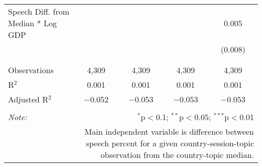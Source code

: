 \begin{table}[!htbp]
\begin{tabular}{@{\extracolsep{5pt}}lcccc}
 Speech Diff. from Median * Log GDP &  &  &  & 0.005 \\ 
  &  &  &  & (0.008) \\ 
  & & & & \\ 
\hline \\[-1.8ex] 
Observations & 4,309 & 4,309 & 4,309 & 4,309 \\ 
R$^{2}$ & 0.001 & 0.001 & 0.001 & 0.001 \\ 
Adjusted R$^{2}$ & $-$0.052 & $-$0.053 & $-$0.053 & $-$0.053 \\ 
\hline 
\hline \\[-1.8ex] 
\textit{Note:}  & \multicolumn{4}{r}{$^{*}$p$<$0.1; $^{**}$p$<$0.05; $^{***}$p$<$0.01} \\ 
 & \multicolumn{4}{r}{Main independent variable is difference between speech percent for a given country-session-topic observation from the country-topic median.} \\ 
\end{tabular} 
\end{table} 

